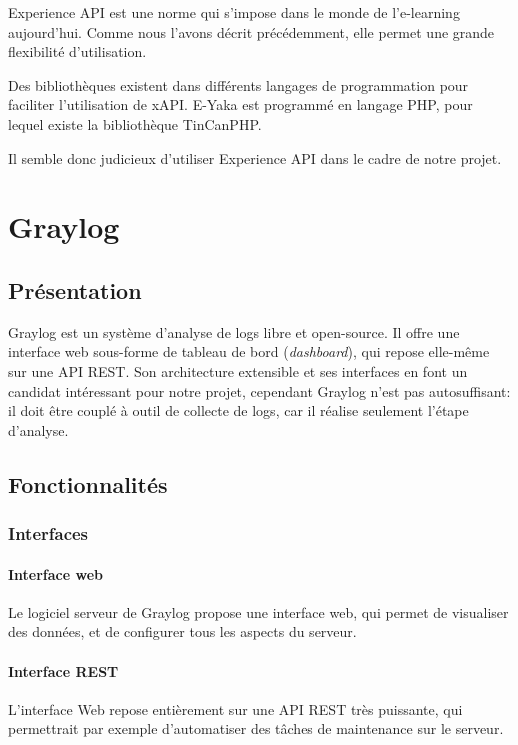             Experience API est une norme qui s’impose dans le monde de l’e-learning aujourd’hui. Comme nous l’avons décrit précédemment, elle permet une grande flexibilité d’utilisation.

            Des bibliothèques existent dans différents langages de programmation pour faciliter l’utilisation de xAPI. E-Yaka est programmé en langage PHP, pour lequel existe la bibliothèque TinCanPHP.

            Il semble donc judicieux d’utiliser Experience API dans le cadre de notre projet.


    \section{Graylog  }

        \subsection{Présentation}
    
            Graylog est un système d'analyse de logs libre et open-source. Il offre une interface web sous-forme de tableau de bord (\emph{dashboard}), qui repose elle-même sur une API REST. Son architecture extensible et ses interfaces en font un candidat intéressant pour notre projet, cependant Graylog n'est pas autosuffisant: il doit être couplé à outil de collecte de logs, car il réalise seulement l'étape d'analyse.
    

        \subsection{Fonctionnalités}

            \subsubsection{Interfaces}

                \paragraph{Interface web}
                    Le logiciel serveur de Graylog propose une interface web, qui permet de visualiser des données, et de configurer tous les aspects du serveur.
                
                \paragraph{Interface REST}
                    L'interface Web repose entièrement sur une API REST très puissante, qui permettrait par exemple d'automatiser des tâches de maintenance sur le serveur.

